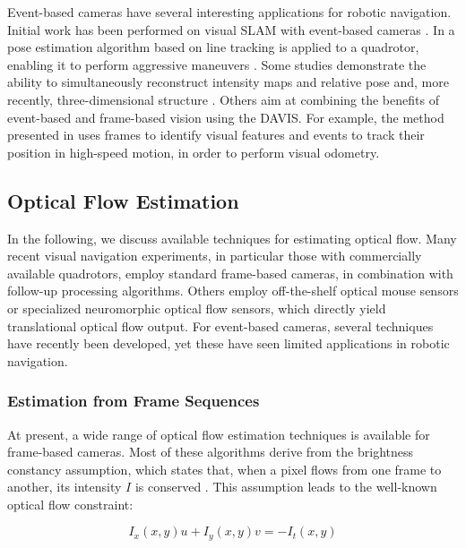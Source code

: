 Event-based cameras have several interesting applications for robotic navigation. Initial work has been performed on visual SLAM with event-based cameras \cite{Weikersdorfer2013,Weikersdorfer2014}. In \citet{Mueggler2014} a pose estimation algorithm based on line tracking is applied to a quadrotor, enabling it to perform aggressive maneuvers . Some studies demonstrate the ability to simultaneously reconstruct intensity maps and relative pose \cite{Kim2014} and, more recently, three-dimensional structure \cite{Kim2016}. Others aim at combining the benefits of event-based and frame-based vision using the DAVIS. For example, the method presented in \citet{Kueng2016} uses frames to identify visual features and events to track their position in high-speed motion, in order to perform visual odometry.

\subsection{Optical Flow Estimation}
\label{sec:related_optical_flow}
In the following, we discuss available techniques for estimating optical flow. Many recent visual navigation experiments, in particular those with commercially available quadrotors, employ standard frame-based cameras, in combination with follow-up processing algorithms. Others employ off-the-shelf optical mouse sensors or specialized neuromorphic optical flow sensors, which directly yield translational optical flow output. For event-based cameras, several techniques have recently been developed, yet these have seen limited applications in robotic navigation.

\subsubsection{Estimation from Frame Sequences}
At present, a wide range of optical flow estimation techniques is available for frame-based cameras. Most of these algorithms derive from the brightness constancy assumption, which states that, when a pixel flows from one frame to another, its intensity $I$ is conserved \cite{Baker2011}. This assumption leads to the well-known optical flow constraint:

\begin{equation}
\label{eq:optical_flow_constraint}
I_x(x,y) u + I_y(x,y) v = -I_t(x,y)
\end{equation}

